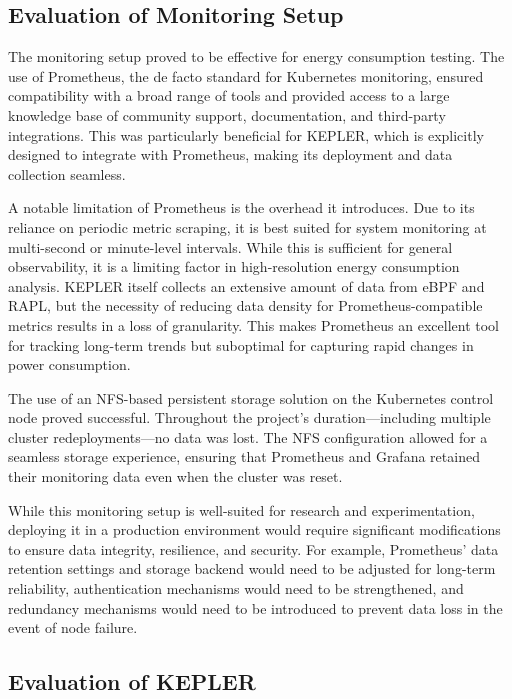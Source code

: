 \subsection{Evaluation of Monitoring Setup}

The monitoring setup proved to be effective for energy consumption testing. The use of Prometheus, the de facto standard for Kubernetes monitoring, ensured compatibility with a broad range of tools and provided access to a large knowledge base of community support, documentation, and third-party integrations. This was particularly beneficial for KEPLER, which is explicitly designed to integrate with Prometheus, making its deployment and data collection seamless.

A notable limitation of Prometheus is the overhead it introduces. Due to its reliance on periodic metric scraping, it is best suited for system monitoring at multi-second or minute-level intervals. While this is sufficient for general observability, it is a limiting factor in high-resolution energy consumption analysis. KEPLER itself collects an extensive amount of data from eBPF and RAPL, but the necessity of reducing data density for Prometheus-compatible metrics results in a loss of granularity. This makes Prometheus an excellent tool for tracking long-term trends but suboptimal for capturing rapid changes in power consumption.

The use of an NFS-based persistent storage solution on the Kubernetes control node proved successful. Throughout the project's duration—including multiple cluster redeployments—no data was lost. The NFS configuration allowed for a seamless storage experience, ensuring that Prometheus and Grafana retained their monitoring data even when the cluster was reset.

While this monitoring setup is well-suited for research and experimentation, deploying it in a production environment would require significant modifications to ensure data integrity, resilience, and security. For example, Prometheus' data retention settings and storage backend would need to be adjusted for long-term reliability, authentication mechanisms would need to be strengthened, and redundancy mechanisms would need to be introduced to prevent data loss in the event of node failure.

\subsection{Evaluation of KEPLER}


